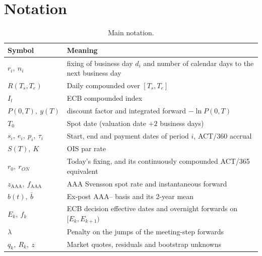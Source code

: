 \documentclass[11pt,a4paper]{article}
\theoremstyle{plain}
\theoremstyle{definition}
\newcommand{\estr}{\text{\texteuro STR}}
\begin{document}
\section{Notation}
\label{app:notation}

\begin{table}[h]
\centering
\begin{tabular}{@{}lp{11.5cm}@{}}
\toprule
Symbol & Meaning \\
\midrule
$r_i,\ n_i$ & \estr{} fixing of business day $d_i$ and number of calendar days to the next business day \\
$R(T_s,T_e)$ & Daily compounded \estr{} over $[T_s,T_e]$ \\
$I_t$ & ECB compounded \estr{} index \\
$P(0,T),\ y(T)$ & \estr{} discount factor and integrated forward $-\ln P(0,T)$ \\
$T_0$ & Spot date (valuation date $+2$ business days) \\
$s_i,\ e_i,\ p_i,\ \tau_i$ & Start, end and payment dates of period $i$, ACT/360 accrual \\
$S(T),\ K$ & \estr{} OIS par rate \\
$r_0,\ r_{ON}$ & Today's \estr{} fixing, and its continuously compounded ACT/365 equivalent \\
$z_{\mathrm{AAA}},\ f_{\mathrm{AAA}}$ & AAA Svensson spot rate and instantaneous forward \\
$b(t),\ \bar b$ & Ex-post AAA--\estr{} basis and its 2-year mean \\
$E_k,\ f_k$ & ECB decision effective dates and overnight forwards on $[E_k,E_{k+1})$ \\
$\lambda$ & Penalty on the jumps of the meeting-step forwards \\
$q_k,\ R_k,\ z$ & Market quotes, residuals and bootstrap unknowns \\
\bottomrule
\end{tabular}
\caption{Main notation.}
\label{tab:notation}
\end{table}

\clearpage
\end{document}
